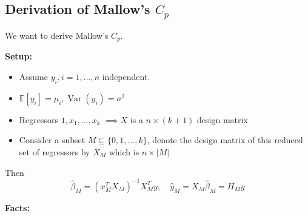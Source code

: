 \documentclass[11pt, %
	oneside, %
	english, %
	onehalfspacing, %
	]{article} %
\numberwithin{equation}{section}
\begin{document}
\subsection{Derivation of Mallow's $C_p$}

We want to derive Mallow's $C_p$.

\textbf{Setup:}

\begin{itemize}
	\item Assume $y_i, i = 1, \dots, n$ independent.
	\item $\mathbb{E} \left[ y_i\right] = \mu_i, \operatorname{Var} \left( y_i\right) = \sigma^2$
	\item Regressors $1, x_1, \dots, x_k$ $\implies X$ is a $n \times (k+1)$ design matrix
	\item Consider a subset $M \subseteq \{ 0,1, \dots,k \}$, denote the design matrix of this reduced set of regressors by $X_M$ which is $n \times \left| M \right|$
\end{itemize}
Then
$$
\hat{\beta}_M = \left( x_M^T X_M \right)^{-1}  X_M^T y, \quad \hat{y}_M = X_M \hat{\beta}_M  = H_M y
$$

\textbf{Facts:}
\end{document}
